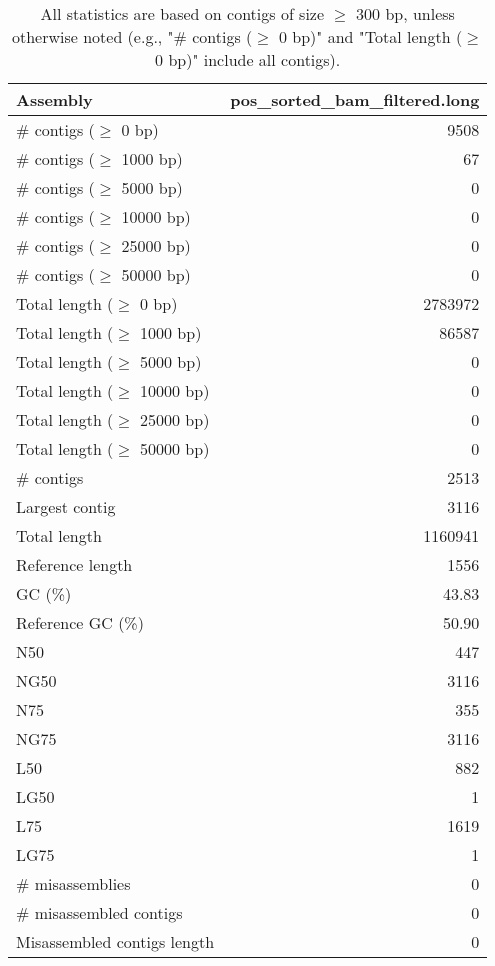 \documentclass[12pt,a4paper]{article}
\begin{document}
\begin{table}[ht]
\begin{center}
\caption{All statistics are based on contigs of size $\geq$ 300 bp, unless otherwise noted (e.g., "\# contigs ($\geq$ 0 bp)" and "Total length ($\geq$ 0 bp)" include all contigs).}
\begin{tabular}{|l*{1}{|r}|}
\hline
Assembly & pos\_sorted\_bam\_filtered.long \\ \hline
\# contigs ($\geq$ 0 bp) & 9508 \\ \hline
\# contigs ($\geq$ 1000 bp) & 67 \\ \hline
\# contigs ($\geq$ 5000 bp) & 0 \\ \hline
\# contigs ($\geq$ 10000 bp) & 0 \\ \hline
\# contigs ($\geq$ 25000 bp) & 0 \\ \hline
\# contigs ($\geq$ 50000 bp) & 0 \\ \hline
Total length ($\geq$ 0 bp) & 2783972 \\ \hline
Total length ($\geq$ 1000 bp) & 86587 \\ \hline
Total length ($\geq$ 5000 bp) & 0 \\ \hline
Total length ($\geq$ 10000 bp) & 0 \\ \hline
Total length ($\geq$ 25000 bp) & 0 \\ \hline
Total length ($\geq$ 50000 bp) & 0 \\ \hline
\# contigs & 2513 \\ \hline
Largest contig & 3116 \\ \hline
Total length & 1160941 \\ \hline
Reference length & 1556 \\ \hline
GC (\%) & 43.83 \\ \hline
Reference GC (\%) & 50.90 \\ \hline
N50 & 447 \\ \hline
NG50 & 3116 \\ \hline
N75 & 355 \\ \hline
NG75 & 3116 \\ \hline
L50 & 882 \\ \hline
LG50 & 1 \\ \hline
L75 & 1619 \\ \hline
LG75 & 1 \\ \hline
\# misassemblies & 0 \\ \hline
\# misassembled contigs & 0 \\ \hline
Misassembled contigs length & 0 \\ \hline

\end{tabular}
\end{center}
\end{table}
\end{document}
